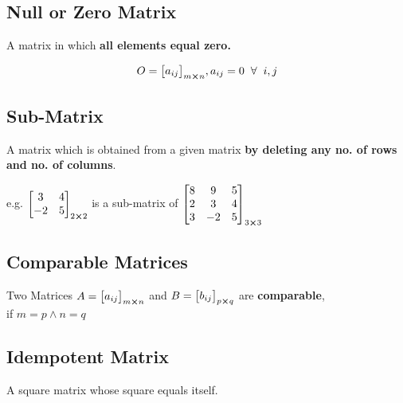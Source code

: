 \documentclass{article}
\begin{document}
\subsection{Null or Zero Matrix}

A matrix in which \textbf{all elements equal zero.}

$$O={\begin{bmatrix}
        a_{ij}
    \end{bmatrix}}_{m \cross n}, a_{ij}=0 \hspace{2mm} \forall \hspace{2mm} i,j $$

\subsection{Sub-Matrix}

A matrix which is obtained from a given matrix \textbf{by deleting any no. of rows and no. of columns}.

e.g. ${\begin{bmatrix}
                3  & 4 \\
                -2 & 5
            \end{bmatrix}}_{2 \cross 2}$ is a sub-matrix of ${\begin{bmatrix}
                8 & 9  & 5 \\
                2 & 3  & 4 \\
                3 & -2 & 5
            \end{bmatrix}}_{3 \cross 3} $

\subsection{Comparable Matrices}

Two Matrices $A={\begin{bmatrix}
        a_{ij}
    \end{bmatrix}}_{m \cross n} $ and $B= {\begin{bmatrix}
        b_{ij}
    \end{bmatrix}}_{p \cross q} $ are \textbf{comparable}, \\if \textbf{$m=p \wedge n = q$}


\subsection{Idempotent Matrix}

A square matrix whose square equals itself.
\end{document}
